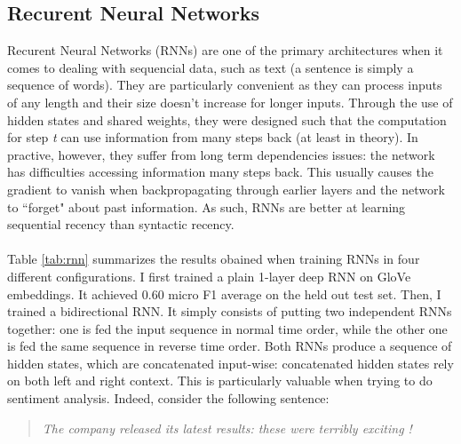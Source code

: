 \documentclass[final]{cvpr}
\begin{document}
\vspace{-5mm}

\subsection{Recurent Neural Networks}

Recurent Neural Networks (RNNs) \cite{rnn-original} are one of the primary architectures when it comes to dealing with sequencial data, such as text (a sentence is simply a sequence of words). They are particularly convenient as they can process inputs of any length and their size doesn’t increase for longer inputs. Through the use of hidden states and shared weights, they were designed such that the computation for step \textit{t} can use information from many steps back (at least in theory). In practive, however, they suffer from long term dependencies issues: the network has difficulties accessing information many steps back. This usually causes the gradient to vanish when backpropagating through earlier layers and the network to “forget" about past information. As such, RNNs are better at learning sequential recency than syntactic recency.\\
\\
Table \ref{tab:rnn} summarizes the results obained when training RNNs in four different configurations. I first trained a plain 1-layer deep RNN on GloVe embeddings. It achieved $0.60$ micro F1 average on the held out test set. Then, I trained a bidirectional RNN. It simply consists of putting two independent RNNs together: one is fed the input sequence in normal time order, while the other one is fed the same sequence in reverse time order. Both RNNs produce a sequence of hidden states, which are concatenated input-wise: concatenated hidden states rely on both left and right context. This is particularly valuable when trying to do sentiment analysis. Indeed, consider the following sentence: 

\vspace{2mm}

\begin{quote}
	\centering
	\textit{The company released its latest results: these were terribly exciting !}
\end{quote}

\vspace{2mm}
\end{document}
